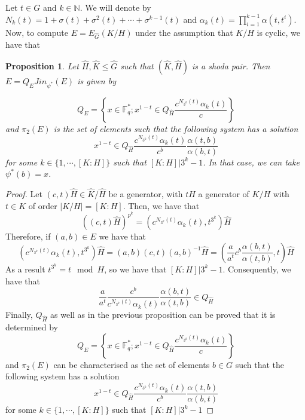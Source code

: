 \documentclass{article}
\newtheorem{proposition}[theorem]{Proposition}
\begin{document}
Let $t\in G$ and $k\in \mathbb{N}$. We will denote by $N_k(t) = 1 + \sigma(t) + \sigma^2(t) + \cdots + \sigma^{k-1}(t)$ and $\alpha_k(t) = \prod_{i=1}^{k-1}\alpha(t,t^i)$. Now, to compute $E=E_{\hat{G}}(K/H)$ under the assumption that $K/H$ is cyclic, we have that
\begin{proposition}
    Let $\hat{H}, \hat{K} \leq \hat{G}$ such that $(\hat{K}, \hat{H})$ is a shoda pair. Then $E=Q_E Jin_{\psi^*}(E)$ is given by

    \begin{equation}
        Q_{E}=\left\{x \in \mathbb{F}_q^*; x^{1-t}  \in Q_{\hat{H}} \frac{c^{N_{3^k}(t)} \alpha_k(t)}{c}  \right\}
    \end{equation}
    and $\pi_2(E)$ is the set of elements such that the following system has a solution
    \begin{equation}
        x^{1-t}\in Q_{\hat{H}} \frac{c^{N_{3^k}(t)} \alpha_k(t)}{c^b} \frac{\alpha(t,b)}{\alpha(b,t)}
    \end{equation}
    for some $k\in \{1,\cdots, [K:H] \}$ such that $[K:H] | 3^k-1$. In that case, we can take $\psi^*(b)=x$.
\end{proposition}
\begin{proof}
    Let $(c, t) \hat{H} \in \hat{K}/ \hat{H}$ be a generator, with $tH$ a generator of $K/H$ with $t\in K$ of order $|K/H| = [K:H]$. Then, we have that
    \begin{equation}
        ((c, t) \hat{H}) ^{p^k} = (c^{N_{3^k}(t)} \alpha_k(t),t^{3^k} ) \hat{H}
    \end{equation}
    Therefore, if $(a,b) \in E$ we have that
    \begin{equation}
        (c^{N_{3^k}(t)} \alpha_k(t),t^{3^k} ) \hat{H} = (a,b)(c, t)(a,b)^{-1} \hat{H} = \left( \frac{a}{a^t}c^b \frac{\alpha(b,t)}{\alpha(t,b)} ,t\right)\hat{H} 
    \end{equation}
    As a result $t^{3^k} = t \mod H$, so we have that $[K:H] | 3^k-1$. Consequently, we have that
    \begin{equation}
        \frac{a}{a^t} \frac{c^b}{c^{N_{3^k}(t)} \alpha_k(t)} \frac{\alpha(b,t)}{\alpha(t,b)} \in Q_{\hat{H}}
    \end{equation}
    Finally, $Q_{\hat{H}}$ as well as in the previous proposition can be proved that it is determined by
    \begin{equation}
        Q_{E}=\left\{x \in \mathbb{F}_q^*; x^{1-t}  \in Q_{\hat{H}} \frac{c^{N_{3^k}(t)} \alpha_k(t)}{c}  \right\}
    \end{equation}
    and $\pi_2(E)$ can be characterised as the set of elements $b\in G$ such that the following system has a solution
    \begin{equation}
        x^{1-t}\in Q_{\hat{H}} \frac{c^{N_{3^k}(t)} \alpha_k(t)}{c^b} \frac{\alpha(t,b)}{\alpha(b,t)}
    \end{equation}
    for some $k\in \{1,\cdots, [K:H] \}$ such that $[K:H] | 3^k-1$
\end{proof}
\end{document}

